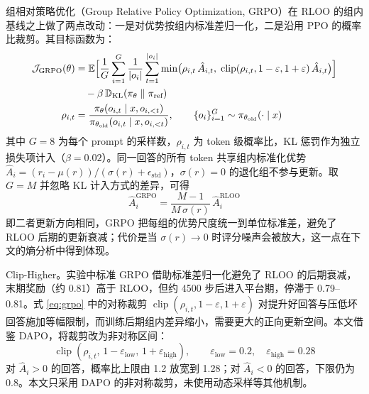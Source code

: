 \documentclass[fontset=fandol,type=master,campus=shenzhen,etitleauto=true]{hithesisbook}
\begin{document}
组相对策略优化（Group Relative Policy Optimization, GRPO）\cite{ref34}在 RLOO 的组内基线之上做了两点改动：一是对优势按组内标准差归一化，二是沿用 PPO 的概率比裁剪。其目标函数为：
\begin{equation}\label{eq:grpo}
\begin{aligned}
\mathcal{J}_{\text{GRPO}}(\theta) &= \mathbb{E} \Bigl[ \frac{1}{G}\sum_{i=1}^{G} \frac{1}{|o_i|}\sum_{t=1}^{|o_i|} \min\bigl( \rho_{i,t}\, \hat{A}_{i,t},\; \operatorname{clip}(\rho_{i,t}, 1-\varepsilon, 1+\varepsilon)\, \hat{A}_{i,t} \bigr) \Bigr] \\
&\quad - \beta\, \mathbb{D}_{\text{KL}}(\pi_\theta \parallel \pi_{\text{ref}}) \\
\rho_{i,t} &= \frac{\pi_\theta(o_{i,t} \mid x, o_{i,<t})}{\pi_{\theta_{\text{old}}}(o_{i,t} \mid x, o_{i,<t})}, \qquad \{o_i\}_{i=1}^{G} \sim \pi_{\theta_{\text{old}}}(\cdot \mid x)
\end{aligned}
\end{equation}
其中 $G = 8$ 为每个 prompt 的采样数，$\rho_{i,t}$ 为 token 级概率比，KL 惩罚作为独立损失项计入（$\beta = 0.02$）。同一回答的所有 token 共享组内标准化优势 $\hat{A}_i = (r_i - \mu(r)) / (\sigma(r) + \epsilon_{\text{std}})$，$\sigma(r) = 0$ 的退化组不参与更新。取 $G = M$ 并忽略 KL 计入方式的差异，可得
\begin{equation}\label{eq:rloo-grpo}
\hat{A}_i^{\text{GRPO}} = \frac{M - 1}{M\, \sigma(r)}\, \hat{A}_i^{\text{RLOO}}
\end{equation}
即二者更新方向相同，GRPO 把每组的优势尺度统一到单位标准差，避免了 RLOO 后期的更新衰减；代价是当 $\sigma(r) \to 0$ 时评分噪声会被放大，这一点在下文的熵分析中得到体现。

Clip-Higher。实验中标准 GRPO 借助标准差归一化避免了 RLOO 的后期衰减，末期奖励（约 0.81）高于 RLOO，但约 4500 步后进入平台期，停滞于 0.79--0.81。式 \eqref{eq:grpo} 中的对称裁剪 $\operatorname{clip}(\rho_{i,t}, 1-\varepsilon, 1+\varepsilon)$ 对提升好回答与压低坏回答施加等幅限制，而训练后期组内差异缩小，需要更大的正向更新空间。本文借鉴 DAPO\cite{ref35}，将裁剪改为非对称区间：
\begin{equation}\label{eq:clip-higher}
\operatorname{clip}(\rho_{i,t},\, 1 - \varepsilon_{\text{low}},\, 1 + \varepsilon_{\text{high}}), \qquad \varepsilon_{\text{low}} = 0.2, \quad \varepsilon_{\text{high}} = 0.28
\end{equation}
对 $\hat{A}_i > 0$ 的回答，概率比上限由 1.2 放宽到 1.28；对 $\hat{A}_i < 0$ 的回答，下限仍为 0.8。本文只采用 DAPO 的非对称裁剪，未使用动态采样等其他机制。
\end{document}
